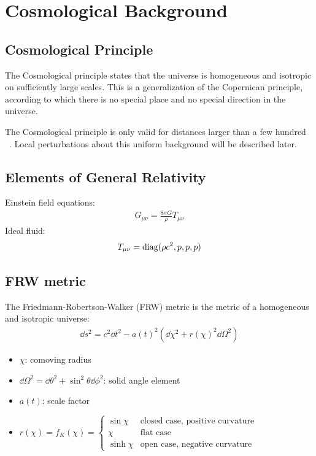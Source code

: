 \chapter{Cosmological Background}

\section{Cosmological Principle}
The Cosmological principle states that the universe is homogeneous and isotropic on sufficiently large scales. This is a generalization of the Copernican principle, according to which there is no special place and no special direction in the universe.

The Cosmological principle is only valid for distances larger than a few hundred \si{\mega\parsec}. Local perturbations about this uniform background will be described later.


\section{Elements of General Relativity}

Einstein field equations:
\begin{align*}
	G_{\mu\nu} = \frac{8\pi G}{\rho} T_{\mu\nu}
\end{align*}
Ideal fluid:
\begin{align*}
	T_{\mu\nu} = \operatorname{diag}(\rho c^2, p, p, p)
\end{align*}



\section{FRW metric}
The Friedmann-Robertson-Walker (FRW) metric is the metric of a homogeneous and isotropic universe:
\begin{align*}
  \dd{s}^2 = c^2 \dd{t}^2 - a(t)^2( \dd{\chi}^2 + r(\chi)^2 \dd{\Omega}^2 )
\end{align*}
\begin{itemize}
	\item $\chi$: comoving radius
	\item $\dd{\Omega}^2 = \dd{\theta}^2 + \sin^2\theta \dd{\phi}^2$: solid angle element
	\item $a(t)$: scale factor
	\item $\displaystyle
		r(\chi) = f_K(\chi) = 
		\begin{cases}
			\sin \chi & \text{closed case, positive curvature}\\
			\chi & \text{flat case}\\
			\sinh \chi & \text{open case, negative curvature}
		\end{cases}
		$
\end{itemize}

